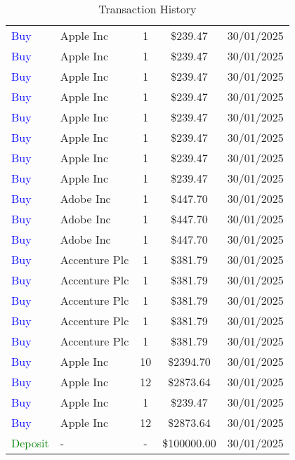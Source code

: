 \documentclass{article}
\begin{document}
\begin{table}[h]
\begin{tabular}{l l c c c}
        \textcolor{blue}{Buy} & Apple Inc & 1 & \$239.47 & 30/01/2025 \\
        \textcolor{blue}{Buy} & Apple Inc & 1 & \$239.47 & 30/01/2025 \\
        \textcolor{blue}{Buy} & Apple Inc & 1 & \$239.47 & 30/01/2025 \\
        \textcolor{blue}{Buy} & Apple Inc & 1 & \$239.47 & 30/01/2025 \\
        \textcolor{blue}{Buy} & Apple Inc & 1 & \$239.47 & 30/01/2025 \\
        \textcolor{blue}{Buy} & Apple Inc & 1 & \$239.47 & 30/01/2025 \\
        \textcolor{blue}{Buy} & Apple Inc & 1 & \$239.47 & 30/01/2025 \\
        \textcolor{blue}{Buy} & Apple Inc & 1 & \$239.47 & 30/01/2025 \\
        \textcolor{blue}{Buy} & Adobe Inc & 1 & \$447.70 & 30/01/2025 \\
        \textcolor{blue}{Buy} & Adobe Inc & 1 & \$447.70 & 30/01/2025 \\
        \textcolor{blue}{Buy} & Adobe Inc & 1 & \$447.70 & 30/01/2025 \\
        \textcolor{blue}{Buy} & Accenture Plc & 1 & \$381.79 & 30/01/2025 \\
        \textcolor{blue}{Buy} & Accenture Plc & 1 & \$381.79 & 30/01/2025 \\
        \textcolor{blue}{Buy} & Accenture Plc & 1 & \$381.79 & 30/01/2025 \\
        \textcolor{blue}{Buy} & Accenture Plc & 1 & \$381.79 & 30/01/2025 \\
        \textcolor{blue}{Buy} & Accenture Plc & 1 & \$381.79 & 30/01/2025 \\
        \textcolor{blue}{Buy} & Apple Inc & 10 & \$2394.70 & 30/01/2025 \\
        \textcolor{blue}{Buy} & Apple Inc & 12 & \$2873.64 & 30/01/2025 \\
        \textcolor{blue}{Buy} & Apple Inc & 1 & \$239.47 & 30/01/2025 \\
        \textcolor{blue}{Buy} & Apple Inc & 12 & \$2873.64 & 30/01/2025 \\
        \textcolor{green}{Deposit} & - & - & \$100000.00 & 30/01/2025 \\
        \bottomrule
    \end{tabular}
    \caption{Transaction History}
    \label{tab:transactions}
\end{table}
\end{document}
